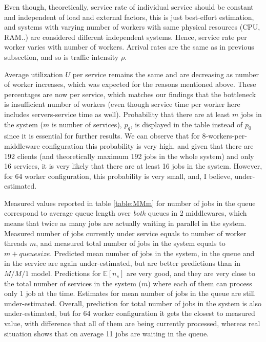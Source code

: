 \documentclass[11pt,a4paper]{article}
\begin{document}
Even though, theoretically, service rate of individual service should be constant and independent of load and external factors, this is just best-effort estimation, and systems with varying number of workers with same physical resources (CPU, RAM..) are considered different independent systems. Hence, service rate per worker varies with number of workers. Arrival rates are the same as in previous subsection, and so is traffic intensity $\rho$.

Average utilization $U$ per service remains the same and are decreasing as number of worker increases, which was expected for the reasons mentioned above. These percentages are now per service, which matches our findings that the bottleneck is insufficient number of workers (even though service time per worker here includes servers-service time as well). Probability that there are at least $m$ jobs in the system ($m$ is number of services), $p_q$, is displayed in the table instead of $p_0$ since it is essential for further results. We can observe that for 8-workers-per-middleware configuration this probability is very high, and given that there are 192 clients (and theoretically maximum 192 jobs in the whole system) and only 16 services, it is very likely that there are at least 16 jobs in the system. However, for 64 worker configuration, this probability is very small, and, I believe, under-estimated. 

Measured values reported in table \ref{table:MMm} for number of jobs in the queue correspond to average queue length over \textit{both} queues in 2 middlewares, which means that twice as many jobs are actually waiting in parallel in the system. Measured number of jobs currently under service equals to number of worker threads $m$, and measured total number of jobs in the system equals to $m + queue size$. Predicted mean number of jobs in the system, in the queue and in the service are again under-estimated, but are better predictions than in $M/M/1$ model. Predictions for $\mathbb{E}[n_s]$ are very good, and they are very close to the total number of services in the system ($m$) where each of them can process only 1 job at the time. Estimates for mean number of jobs in the queue are still under-estimated. Overall, prediction for total number of jobs in the system is also under-estimated, but for 64 worker configuration it gets the closest to measured value, with difference that all of them are being currently processed, whereas real situation shows that on average 11 jobs are waiting in the queue. 
\end{document}
